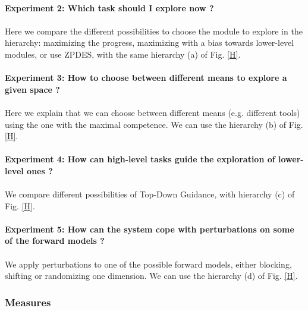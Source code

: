 \documentclass[12pt]{article}
\begin{document}
				\paragraph{Experiment 2: Which task should I explore now ?}
				\paragraph{}
				Here we compare the different possibilities to choose the module to explore in the hierarchy: maximizing the progress, maximizing with a bias towards lower-level modules, or use ZPDES,
				with the same hierarchy (a) of Fig. \ref{H}.
				
				\paragraph{Experiment 3: How to choose between different means to explore a given space ?}
				\paragraph{}
				Here we explain that we can choose between different means (e.g. different tools) using the one with the maximal competence.
				We can use the hierarchy (b) of Fig. \ref{H}.
				
				\paragraph{Experiment 4: How can high-level tasks guide the exploration of lower-level ones ?}
				\paragraph{}
				We compare different possibilities of Top-Down Guidance, 
				with hierarchy (c) of Fig. \ref{H}.
				
				\paragraph{Experiment 5: How can the system cope with perturbations on some of the forward models ?}
				\paragraph{}
				We apply perturbations to one of the possible forward models, either blocking, shifting or randomizing one dimension. 
				We can use the hierarchy (d) of Fig. \ref{H}.
				

		\subsubsection{Measures}
		
\end{document}

